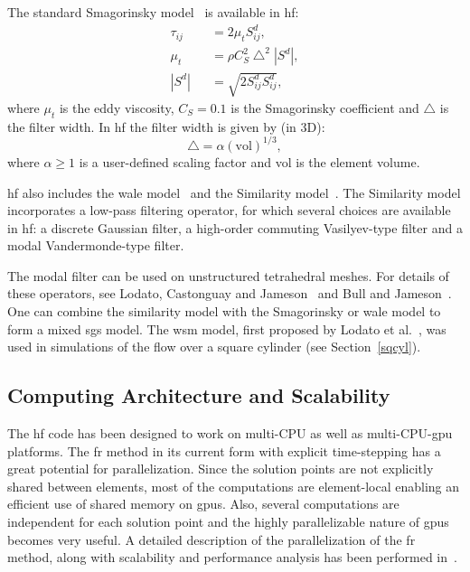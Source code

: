 The standard Smagorinsky model~\cite{smagorinsky1963} is available in \gls{hf}:
\begin{eqnarray}\label{smag}
\tau_{ij} &&= 2 \mu_t S^d_{ij}, \\
\mu_t &&= \rho C_S^2 \bigtriangleup^2 | S^d |,\\
| S^d | &&= \sqrt{2 S^d_{ij} S^d_{ij}},
\end{eqnarray}
where $\mu_t$ is the eddy viscosity, $C_S = 0.1$ is the Smagorinsky coefficient and $\bigtriangleup$ is the filter width. In \gls{hf} the filter width is given by (in 3D):
\begin{equation}
\bigtriangleup = \alpha (\text{vol})^{1/3},
\end{equation}
where $\alpha \geq 1$ is a user-defined scaling factor and vol is the element volume.

\gls{hf} also includes the \gls{wale} model~\cite{nicoud1999} and the Similarity model~\cite{bardina1980}.
The Similarity model incorporates a low-pass filtering operator, for which several choices are available in \gls{hf}: a discrete Gaussian filter\cite{lodato2012b}, a high-order commuting Vasilyev-type filter\cite{vasilyev1998,vasilyev2001} and a modal Vandermonde-type filter\cite{blackburn2003}.

The modal filter can be used on unstructured tetrahedral meshes. For details of these operators, see Lodato, Castonguay and Jameson~\cite{lodato2012b} and Bull and Jameson~\cite{bull2014a}. One can combine the similarity model with the Smagorinsky or \gls{wale} model to form a mixed \gls{sgs} model. The \gls{wsm} model, first proposed by Lodato et al.~\cite{lodato2009}, was used in simulations of the flow over a square cylinder (see Section~\ref{sqcyl}).

\subsection{Computing Architecture and Scalability}

The \gls{hf} code has been designed to work on multi-CPU as well as multi-CPU-\gls{gpu} platforms. The \gls{fr} method in its current form with explicit time-stepping has a great potential for parallelization. Since the solution points are not explicitly shared between elements, most of the computations are element-local enabling an efficient use of shared memory on \gls{gpu}s. Also, several computations are independent for each solution point and the highly parallelizable nature of \gls{gpu}s becomes very useful. A detailed description of the parallelization of the \gls{fr} method, along with scalability and performance analysis has been performed in~\cite{castonguay2011}.